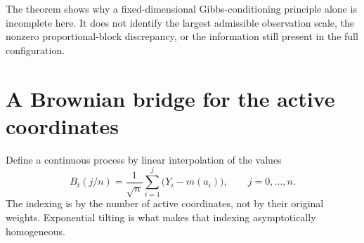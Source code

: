 \documentclass[11pt,letterpaper]{article}
\numberwithin{equation}{section}
\theoremstyle{definition}
\theoremstyle{remark}
\begin{document}
The theorem shows why a fixed-dimensional Gibbs-conditioning principle alone
is incomplete here. It does not identify the largest admissible observation
scale, the nonzero proportional-block discrepancy, or the information still
present in the full configuration.

\section{A Brownian bridge for the active coordinates}
\label{sec:process}

Define a continuous process by linear interpolation of the values
\begin{equation}
 B_t(j/n)=\frac1{\sqrt n}\sum_{i=1}^j\big(Y_i-m(a_i)\big),
 \qquad j=0,\ldots,n.
 \label{eq:process}
\end{equation}
The indexing is by the number of active coordinates, not by their original
weights. Exponential tilting is what makes that indexing asymptotically
homogeneous.
\end{document}
